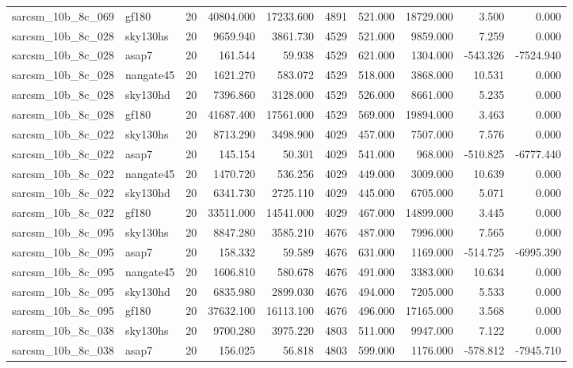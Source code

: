 \documentclass{article}
\begin{document}
\begin{longtable}{llrrrrrrrr}
sarcsm\_10b\_8c\_069 & gf180 & 20 & 40804.000 & 17233.600 & 4891 & 521.000 & 18729.000 & 3.500 & 0.000 \\
sarcsm\_10b\_8c\_028 & sky130hs & 20 & 9659.940 & 3861.730 & 4529 & 521.000 & 9859.000 & 7.259 & 0.000 \\
sarcsm\_10b\_8c\_028 & asap7 & 20 & 161.544 & 59.938 & 4529 & 621.000 & 1304.000 & -543.326 & -7524.940 \\
sarcsm\_10b\_8c\_028 & nangate45 & 20 & 1621.270 & 583.072 & 4529 & 518.000 & 3868.000 & 10.531 & 0.000 \\
sarcsm\_10b\_8c\_028 & sky130hd & 20 & 7396.860 & 3128.000 & 4529 & 526.000 & 8661.000 & 5.235 & 0.000 \\
sarcsm\_10b\_8c\_028 & gf180 & 20 & 41687.400 & 17561.000 & 4529 & 569.000 & 19894.000 & 3.463 & 0.000 \\
sarcsm\_10b\_8c\_022 & sky130hs & 20 & 8713.290 & 3498.900 & 4029 & 457.000 & 7507.000 & 7.576 & 0.000 \\
sarcsm\_10b\_8c\_022 & asap7 & 20 & 145.154 & 50.301 & 4029 & 541.000 & 968.000 & -510.825 & -6777.440 \\
sarcsm\_10b\_8c\_022 & nangate45 & 20 & 1470.720 & 536.256 & 4029 & 449.000 & 3009.000 & 10.639 & 0.000 \\
sarcsm\_10b\_8c\_022 & sky130hd & 20 & 6341.730 & 2725.110 & 4029 & 445.000 & 6705.000 & 5.071 & 0.000 \\
sarcsm\_10b\_8c\_022 & gf180 & 20 & 33511.000 & 14541.000 & 4029 & 467.000 & 14899.000 & 3.445 & 0.000 \\
sarcsm\_10b\_8c\_095 & sky130hs & 20 & 8847.280 & 3585.210 & 4676 & 487.000 & 7996.000 & 7.565 & 0.000 \\
sarcsm\_10b\_8c\_095 & asap7 & 20 & 158.332 & 59.589 & 4676 & 631.000 & 1169.000 & -514.725 & -6995.390 \\
sarcsm\_10b\_8c\_095 & nangate45 & 20 & 1606.810 & 580.678 & 4676 & 491.000 & 3383.000 & 10.634 & 0.000 \\
sarcsm\_10b\_8c\_095 & sky130hd & 20 & 6835.980 & 2899.030 & 4676 & 494.000 & 7205.000 & 5.533 & 0.000 \\
sarcsm\_10b\_8c\_095 & gf180 & 20 & 37632.100 & 16113.100 & 4676 & 496.000 & 17165.000 & 3.568 & 0.000 \\
sarcsm\_10b\_8c\_038 & sky130hs & 20 & 9700.280 & 3975.220 & 4803 & 511.000 & 9947.000 & 7.122 & 0.000 \\
sarcsm\_10b\_8c\_038 & asap7 & 20 & 156.025 & 56.818 & 4803 & 599.000 & 1176.000 & -578.812 & -7945.710 \\

\end{longtable}
\end{document}
